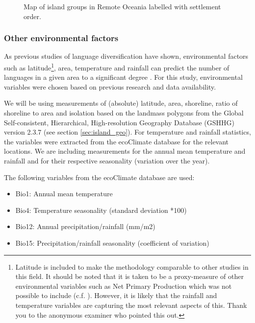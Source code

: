 \documentclass[a4paper,10pt]{article} %
\begin{document}
\begin{figure}
\centering
\caption{{Map of island groups in Remote Oceania labelled with settlement order.}}
\label{dates_map}
\end{figure}

\subsubsection{Other environmental factors} 
As previous studies of language diversification have shown, environmental factors such as latitude\footnote{Latitude is included to make the methodology comparable to other studies in this field. It should be noted that it is taken to be a proxy-measure of other environmental variables such as Net Primary Production which was not possible to include (c.f. \citet{hillebrand2004generality}). However, it is likely that the rainfall and temperature variables are capturing the most relevant aspects of this. Thank you to the anonymous examiner who pointed this out.}, area, temperature and rainfall can predict the number of languages in a given area to a significant degree \citep{ greenhill2015demographic, gavin2017process, Pacheco_Coelho_2019, hua2019ecological}. For this study, environmental variables were chosen based on previous research and data availability. 

We will be using measurements of (absolute) latitude, area, shoreline, ratio of shoreline to area and isolation based on the landmass polygons from the Global Self-consistent, Hierarchical, High-resolution Geography Database (GSHHG) version 2.3.7 \citep{wessel1996global} (see section \ref{sec:island_geo}). For temperature and rainfall statistics, the variables were extracted from the ecoClimate database \citep{ecoclimate} for the relevant locations. We are including measurements for the annual mean temperature and rainfall and for their respective seasonality (variation over the year).

The following variables from the ecoClimate database are used:

\begin{itemize}
\item Bio1: Annual mean temperature
\item Bio4: Temperature seasonality (standard deviation *100)
\item Bio12: Annual precipitation/rainfall (mm/m2)
\item Bio15: Precipitation/rainfall seasonality (coefficient of variation)
\end{itemize}
\end{document}
